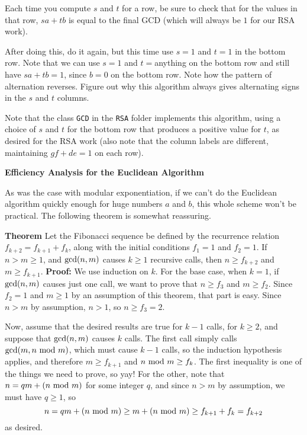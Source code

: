 Each time you compute $s$ and $t$ for a row, be sure to check that for the
values in that row,  $ sa + tb $ is equal to the final GCD (which will always be $1$ for our RSA work).
\medskip

After doing this, do it again, but this time use $s=1$ and $t=1$ in the bottom row.
Note that we can use $s=1$ and $t=$anything on the bottom row and still have
$sa+tb = 1$, since $b=0$ on the bottom row.
Note how the pattern of alternation reverses.  
Figure out why this algorithm always gives alternating signs in the $s$ and $t$ columns.
\bigskip

Note that the class {\tt GCD} in the {\tt RSA} folder implements this algorithm,
using a choice of $s$ and $t$ for the bottom row that produces a positive value for
$t$, as desired for the RSA work (also note that the column labels are different, maintaining
$ g f + d e = 1$ on each row).
\border

\vfil\eject

{\bf Efficiency Analysis for the Euclidean Algorithm}
\medskip

As was the case with modular exponentiation, if we can't do the Euclidean algorithm
quickly enough for  huge numbers $a$ and $b$, this
whole scheme won't be practical.
The following theorem is somewhat reassuring.
\medskip

{\bf Theorem}  Let the Fibonacci sequence be defined by the recurrence relation\hfil\break
$f_{k+2} = f_{k+1} + f_k$, along with the initial conditions $f_1=1$ and $f_2=1$.
If $n > m \ge 1$, and $\hbox{gcd}(n,m)$ causes $k\ge 1$ recursive calls,
then
$n \ge f_{k+2}$ and $m \ge f_{k+1}$.
\medskip
\In
{\bf Proof:}  We use induction on $k$.
\medskip
For the base case, when $k=1$, if $\hbox{gcd}(n,m)$ causes just one call,
we want to prove that $n \ge f_3 $ and $m \ge f_2$.
Since $f_2 = 1$ and $m \ge 1$ by an assumption of this theorem, that part is easy.
Since $n>m$ by assumption, $n > 1$, so $n \ge f_3 = 2$.
\medskip

\def\mod{\hbox{ mod }}

Now, assume that the desired results are true for $k-1$ calls, for $k\ge 2$, and
suppose that $\hbox{gcd}(n,m)$ causes $k$ calls.
The first call simply calls $\hbox{gcd}( m, n \mod m)$, which must cause $k-1$ calls,
so the induction hypothesis applies, and therefore
$m \ge f_{k+1}$ and $ n \mod m \ge f_k$.
The first inequality is one of the things we need to prove, so yay!
For the other, note that $ n = qm + (n \mod m)$ for some integer $q$, 
and since $n > m$ by assumption, we must have $q \ge 1$, so
$$
n = qm + (n\mod m) \ge m + (n \mod m) \ge f_{k+1} + f_k  =  f_{k+2}
$$
as desired.
\medskip
\Out 
\border

